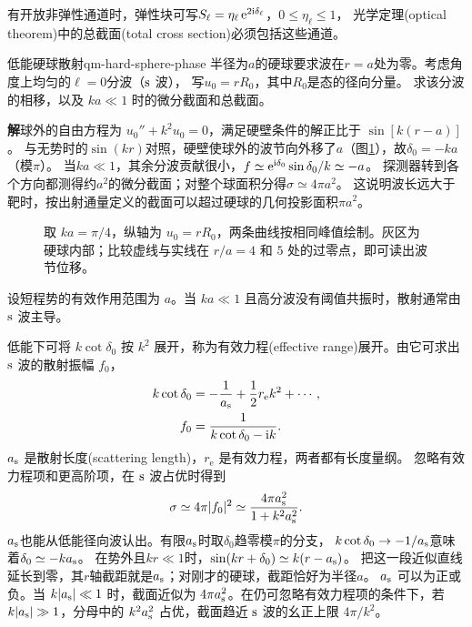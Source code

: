 有开放非弹性通道时，弹性块可写$S_\ell = \eta_\ell\mathop{}\!\mathrm{e}^{2\mathrm{i}\delta_\ell}$，$0 \leq \eta_\ell \leq 1$，
光学定理(optical theorem)中的总截面(total cross section)必须包括这些通道。

\begin{example}{低能硬球散射}{qm-hard-sphere-phase}
    半径为$a$的硬球要求波在$r = a$处为零。考虑角度上均匀的$\ell = 0$分波（$\mathrm{s}$ 波），
    写$u_0 = rR_0$，其中$R_0$是态的径向分量。
    求该分波的相移，以及 $ka \ll 1$ 时的微分截面和总截面。

    \par\smallskip\textbf{解}\quad 球外的自由方程为 $u_0'' + k^2u_0 = 0$，满足硬壁条件的解正比于 $\sin[k(r - a)]$。
    与无势时的$\sin(kr)$对照，硬壁使球外的波节向外移了$a$（图\ref{fig:hard-sphere-nodes}），故$\delta_0 = -ka$（模$\pi$）。
    当$ka \ll 1$，其余分波贡献很小，$f \simeq \mathop{}\!\mathrm{e}^{\mathrm{i}\delta_0}\sin\delta_0/k \simeq -a$。
    探测器转到各个方向都测得约$a^2$的微分截面；对整个球面积分得$\sigma \simeq 4\pi a^2$。
    这说明波长远大于靶时，按出射通量定义的截面可以超过硬球的几何投影面积$\pi a^2$。
\end{example}

\begin{figure}[htbp]
    \centering
    \caption{取 $ka = \pi/4$，纵轴为 $u_0 = rR_0$，两条曲线按相同峰值绘制。灰区为硬球内部；比较虚线与实线在 $r/a = 4$ 和 $5$ 处的过零点，即可读出波节位移。}
    \label{fig:hard-sphere-nodes}
\end{figure}

设短程势的有效作用范围为 $a$。当 $ka \ll 1$ 且高分波没有阈值共振时，散射通常由 $\mathrm{s}$ 波主导。

低能下可将 $k\cot\delta_0$ 按 $k^2$ 展开，称为有效力程(effective range)展开。由它可求出 $\mathrm{s}$ 波的散射振幅 $f_0$，
\begin{subequations}
    \begin{align}
        k\cot\delta_0 &= -\frac1{a_{\mathrm{s}}} + \frac12r_{\mathrm{e}} k^2 + \cdots,\\
        f_0 &= \frac1{k\cot\delta_0 - \mathrm{i} k}.
    \end{align}
\end{subequations}
$a_{\mathrm{s}}$ 是散射长度(scattering length)，$r_{\mathrm{e}}$ 是有效力程，两者都有长度量纲。
忽略有效力程项和更高阶项，在 $\mathrm{s}$ 波占优时得到
\begin{equation}
    \sigma \simeq 4\pi\lvert f_0\rvert^2
        \simeq \frac{4\pi a_{\mathrm{s}}^2}{1 + k^2a_{\mathrm{s}}^2}.
\end{equation}
$a_{\mathrm{s}}$也能从低能径向波认出。有限$a_{\mathrm{s}}$时取$\delta_0$趋零模$\pi$的分支，
$k\cot\delta_0 \to -1/a_{\mathrm{s}}$意味着$\delta_0 \simeq -ka_{\mathrm{s}}$。
在势外且$kr \ll 1$时，$\sin(kr + \delta_0) \simeq k(r - a_{\mathrm{s}})$。
把这一段近似直线延长到零，其$r$轴截距就是$a_{\mathrm{s}}$；对刚才的硬球，截距恰好为半径$a$。
$a_{\mathrm{s}}$ 可以为正或负。当 $k\lvert a_{\mathrm{s}}\rvert \ll 1$ 时，截面近似为 $4\pi a_{\mathrm{s}}^2$。在仍可忽略有效力程项的条件下，若 $k\lvert a_{\mathrm{s}}\rvert \gg 1$，分母中的 $k^2 a_{\mathrm{s}}^2$ 占优，截面趋近 $\mathrm{s}$ 波的幺正上限 $4\pi/k^2$。

